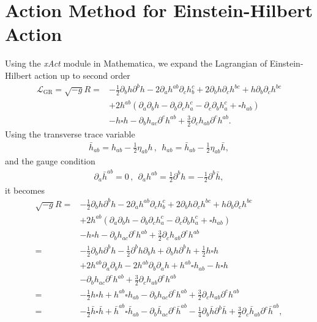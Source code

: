 \documentclass[
    jor,
    amsmath,amssymb,preprint,
    superscriptaddress,
]{revtex4-2}
\begin{document}
\section{Action Method for Einstein-Hilbert Action}

Using the \textit{xAct} module in Mathematica, we expand the Lagrangian of Einstein-Hilbert action up to second order
\begin{equation}
\begin{aligned}
\mathcal{L}_{\mathrm{GR}} = \sqrt{-g}R = & -\frac{1}{2}\partial_b h \partial^b h - 2\partial_a h^{ab}\partial_c h^c_b + 2\partial_b h\partial_c h^{bc} + h\partial_b\partial_c h^{bc} \\
& + 2h^{ab}(\partial_a\partial_b h-\partial_b\partial_c h^c_a - \partial_c\partial_b h^c_a + \square h_{ab})\\
& - h \square h - \partial_b h_{ac}\partial^c h^{ab} + \frac{3}{2}\partial_c h_{ab}\partial^c h^{ab}.
\end{aligned}
\end{equation}
Using the transverse trace variable 
\begin{align}
\bar{h}_{ab} = h_{ab} - \frac{1}{2}\eta_{ab}h\,,~~h_{ab} = \bar{h}_{ab} - \frac{1}{2}\eta_{ab}\bar{h},
\end{align}
and the gauge condition
\begin{align}
\partial_a \bar{h}^{ab} = 0\,,~~\partial_ah^{ab} = \frac{1}{2} \partial^b h=-\frac{1}{2}\partial^b\bar{h},
\end{align}
it becomes 
\begin{equation}
\begin{aligned}
\sqrt{-g}R = & -\frac{1}{2}\partial_b h \partial^b h - 2\partial_a h^{ab}\partial_c h^c_b + 2\partial_b h\partial_c h^{bc} + h\partial_b\partial_c h^{bc} \\
& + 2h^{ab}(\partial_a\partial_b h-\partial_b\partial_c h^c_a - \partial_c\partial_b h^c_a + \square h_{ab})\\
& - h \square h - \partial_b h_{ac}\partial^c h^{ab} + \frac{3}{2}\partial_c h_{ab}\partial^c h^{ab} \\
= & -\frac{1}{2}\partial_bh\partial^b h - \frac{1}{2}\partial^bh\partial_bh + \partial_bh\partial^bh + \frac{1}{2} h\square h \\
& + 2h^{ab}\partial_a\partial_b h - 2h^{ab}\partial_b\partial_a h + h^{ab}\square h_{ab} - h\square h\\
& - \partial_b h_{ac}\partial^c h^{ab} + \frac{3}{2}\partial_c h_{ab}\partial^c h^{ab}\\
= & -\frac{1}{2} h\square h + h^{ab}\square h_{ab} - \partial_b h_{ac}\partial^c h^{ab} + \frac{3}{2}\partial_c h_{ab}\partial^c h^{ab} \\
= & -\frac{1}{2} \bar{h}\square \bar{h} + \bar{h}^{ab}\square \bar{h}_{ab} - \partial_b \bar{h}_{ac}\partial^c \bar{h}^{ab} - \frac{1}{4}\partial_b\bar{h} \partial^b\bar{h} + \frac{3}{2}\partial_c \bar{h}_{ab}\partial^c \bar{h}^{ab},
\end{aligned}
\end{equation}
\end{document}

